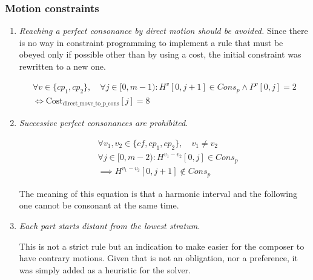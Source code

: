 \subsubsection{Motion constraints}
\begin{enumerate}[wide, label=\bfseries 1.P\arabic*]
    \item\label{constraint:direct-to-p-cons} \reddot \textit{Reaching a perfect consonance by direct motion should be avoided.}
    Since there is no way in constraint programming to implement a rule that must be obeyed only if possible other than by using a cost, the initial constraint was rewritten to a new one.

    \begin{equation} \begin{aligned}
    \forall v \in \{cp_1, cp_2\}, \quad \forall j \in [0, m-1) : H^{v}[0, j+1] \in Cons_{p} \land P^{v}[0, j] = 2 \\
    \iff \text{{Cost}}_{\text{{direct\_move\_to\_p\_cons}}}[j] = 8
    \end{aligned} \end{equation}
    
\setcounter{enumi}{3} %
    \item\label{constraint:succ-p-cons} \reddot  \textit{Successive perfect consonances are prohibited.}

    \begin{equation} \begin{aligned}
    &\forall v_1, v_2 \in \{cf, cp_1, cp_2\}, \quad v_1 \neq v_2 \quad \\
    &\forall j \in [0, m-2) \colon H^{v_1-v_2}[0, j] \in Cons_p \\
    &\implies H^{v_1-v_2}[0, j+1] \notin Cons_p
    \end{aligned} \end{equation}

    The meaning of this equation is that a harmonic interval and the following one cannot be consonant at the same time.
    
    \item\label{constraint:start-distant} \reddot \textit{Each part starts distant from the lowest stratum.}

    This is not a strict rule but an indication to make easier for the composer to have contrary motions. Given that is not an obligation, nor a preference, it was simply added as a heuristic for the solver.




\end{enumerate}
